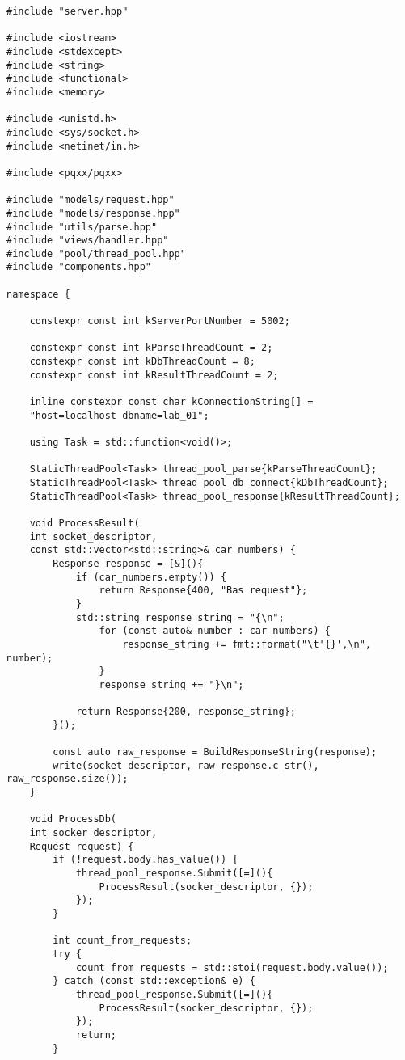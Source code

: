 \begin{lstlisting}[caption=Реализация сервара и конвеера из файла server/server.cpp]
#include "server.hpp"

#include <iostream>
#include <stdexcept>
#include <string>
#include <functional>
#include <memory>

#include <unistd.h>
#include <sys/socket.h>
#include <netinet/in.h>

#include <pqxx/pqxx>

#include "models/request.hpp"
#include "models/response.hpp"
#include "utils/parse.hpp"
#include "views/handler.hpp"
#include "pool/thread_pool.hpp"
#include "components.hpp"

namespace {
	
	constexpr const int kServerPortNumber = 5002;
	
	constexpr const int kParseThreadCount = 2;
	constexpr const int kDbThreadCount = 8;
	constexpr const int kResultThreadCount = 2;
	
	inline constexpr const char kConnectionString[] =
	"host=localhost dbname=lab_01";
	
	using Task = std::function<void()>;
	
	StaticThreadPool<Task> thread_pool_parse{kParseThreadCount};
	StaticThreadPool<Task> thread_pool_db_connect{kDbThreadCount};
	StaticThreadPool<Task> thread_pool_response{kResultThreadCount};
	
	void ProcessResult(
	int socket_descriptor,
	const std::vector<std::string>& car_numbers) {
		Response response = [&](){
			if (car_numbers.empty()) {
				return Response{400, "Bas request"};
			}
			std::string response_string = "{\n";
				for (const auto& number : car_numbers) {
					response_string += fmt::format("\t'{}',\n", number);
				}
				response_string += "}\n";
			
			return Response{200, response_string};
		}();
		
		const auto raw_response = BuildResponseString(response);
		write(socket_descriptor, raw_response.c_str(), raw_response.size());
	}
	
	void ProcessDb(
	int socker_descriptor,
	Request request) {
		if (!request.body.has_value()) {
			thread_pool_response.Submit([=](){
				ProcessResult(socker_descriptor, {});
			});
		}
		
		int count_from_requests;
		try {
			count_from_requests = std::stoi(request.body.value());
		} catch (const std::exception& e) {
			thread_pool_response.Submit([=](){
				ProcessResult(socker_descriptor, {});
			});
			return;
		}
		

\end{lstlisting}
